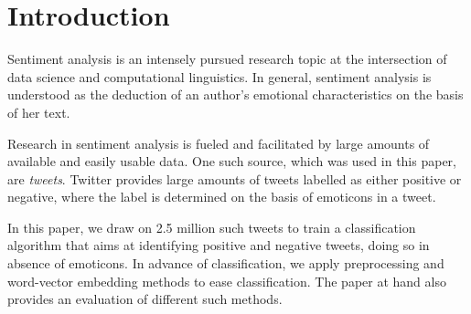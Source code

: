 \section{Introduction}

Sentiment analysis is an intensely pursued research topic at the intersection of data science and computational linguistics. In general, sentiment analysis is understood as the deduction of an author's emotional characteristics on the basis of her text.

Research in sentiment analysis is fueled and facilitated by large amounts of available and easily usable data. One such source, which was used in this paper, are \textit{tweets}. Twitter \cite{twitter} provides large amounts of tweets labelled as either positive or negative, where the label is determined on the basis of emoticons in a tweet.

In this paper, we draw on 2.5 million such tweets to train a classification algorithm that aims at identifying positive and negative tweets, doing so in absence of emoticons. In advance of classification, we apply preprocessing and word-vector embedding methods to ease classification. The paper at hand also provides an evaluation of different such methods.